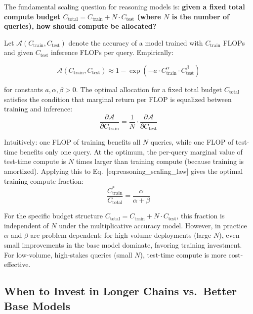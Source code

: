 The fundamental scaling question for reasoning models is: \textbf{given a fixed total compute budget $C_{\text{total}} = C_{\text{train}} + N \cdot C_{\text{test}}$ (where $N$ is the number of queries), how should compute be allocated?}

Let $\mathcal{A}(C_{\text{train}}, C_{\text{test}})$ denote the accuracy of a model trained with $C_{\text{train}}$ FLOPs and given $C_{\text{test}}$ inference FLOPs per query. Empirically:

\begin{equation}
    \mathcal{A}(C_{\text{train}}, C_{\text{test}}) \approx 1 - \exp\!\left(-a \cdot C_{\text{train}}^{\alpha} \cdot C_{\text{test}}^{\beta}\right)
\end{equation}

for constants $a, \alpha, \beta > 0$. The optimal allocation for a fixed total budget $C_{\text{total}}$ satisfies the condition that marginal return per FLOP is equalized between training and inference: 
\begin{equation}
    \frac{\partial \mathcal{A}}{\partial C_{\text{train}}} = \frac{1}{N} \cdot \frac{\partial \mathcal{A}}{\partial C_{\text{test}}}
\end{equation}

Intuitively: one FLOP of training benefits all $N$ queries, while one FLOP of test-time benefits only one query. At the optimum, the per-query marginal value of test-time compute is $N$ times larger than training compute (because training is amortized). Applying this to Eq.~[eq:reasoning\_scaling\_law] gives the optimal training compute fraction: 
\begin{equation}
    \frac{C_{\text{train}}^*}{C_{\text{total}}} = \frac{\alpha}{\alpha + \beta}
\end{equation}

For the specific budget structure $C_{\text{total}} = C_{\text{train}} + N \cdot C_{\text{test}}$, this fraction is independent of $N$ under the multiplicative accuracy model. However, in practice $\alpha$ and $\beta$ are problem-dependent: for high-volume deployments (large $N$), even small improvements in the base model dominate, favoring training investment. For low-volume, high-stakes queries (small $N$), test-time compute is more cost-effective.

\subsection{When to Invest in Longer Chains vs.~Better Base Models}
\label{when-to-invest-in-longer-chains-vs.-better-base-models}

